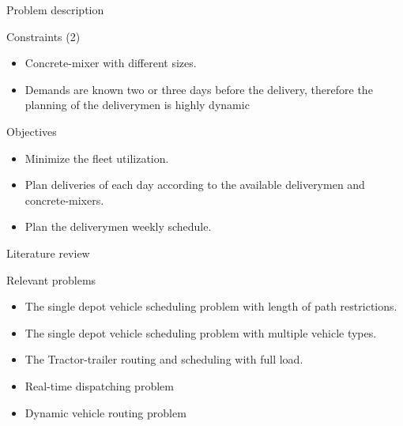 \documentclass[9pt,xcolor={dvipsnames}]{beamer}
\begin{document}
\begin{frame}{Problem description}

\begin{block}{Constraints (2)}
\begin{itemize}

\item Concrete-mixer with different sizes.

\item Demands are known two or three days before the delivery, therefore the planning of the deliverymen is highly dynamic

\end{itemize}
\end{block}

\begin{block}{Objectives}
\begin{itemize}
\item Minimize the fleet utilization.
\item Plan deliveries of each day according to the available deliverymen and concrete-mixers.
\item Plan the deliverymen weekly schedule.
	
\end{itemize}
\end{block}

\end{frame}

\begin{frame}{Literature review}

\begin{block}{Relevant problems}
\begin{itemize}
\item The single depot vehicle scheduling problem with length of path restrictions. \citep{raff1983routing}
\item The single depot vehicle scheduling problem with multiple vehicle types. \citep{raff1983routing}
\item The Tractor-trailer routing and scheduling with full load. \citep{raff1983routing}
\item Real-time dispatching problem \citep{brown1981real}
\item Dynamic vehicle routing problem \citep{liao2004tabu}
\end{itemize}
\end{block}


\end{frame}
\end{document}

